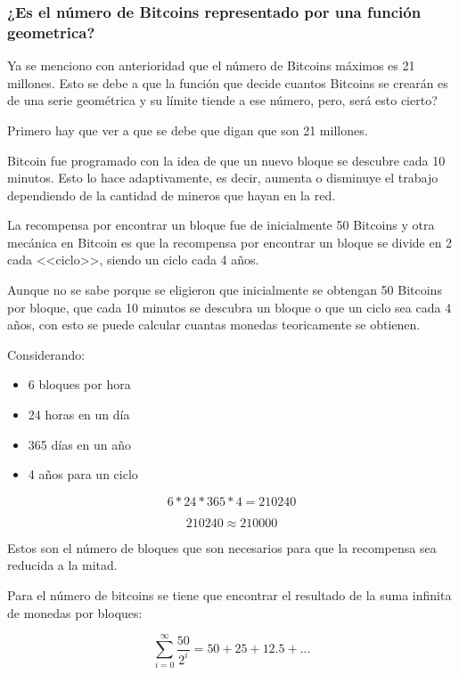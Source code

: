 \documentclass[12pt,letterpaper]{article}
\begin{document}
    \subsubsection*{¿Es el número de Bitcoins representado por una función geometrica?}

    Ya se menciono con anterioridad que el n\'umero de Bitcoins m\'aximos es 21 millones. Esto se debe a que la funci\'on que decide cuantos Bitcoins se crear\'an es de una serie geom\'etrica y su l\'imite tiende a ese n\'umero, pero, ser\'a esto cierto? 

    Primero hay que ver a que se debe que digan que son 21 millones.

    Bitcoin fue programado con la idea de que un nuevo bloque se descubre cada 10 minutos. Esto lo hace adaptivamente, es decir, aumenta o disminuye el trabajo dependiendo de la cantidad de mineros que hayan en la red.

    La recompensa por encontrar un bloque fue de inicialmente 50 Bitcoins y otra mec\'anica en Bitcoin es que la recompensa por encontrar un bloque se divide en 2 cada <<ciclo>>, siendo un ciclo cada 4 a\~nos.

    Aunque no se sabe porque se eligieron que inicialmente se obtengan 50 Bitcoins por bloque, que cada 10 minutos se descubra un bloque o que un ciclo sea cada 4 a\~nos, con esto se puede calcular cuantas monedas teoricamente se obtienen.

    Considerando: 
    \begin{itemize}
        \item 6 bloques por hora 

        \item 24 horas en un d\'ia

        \item 365 d\'ias en un a\~no

        \item4 a\~nos para un ciclo

    \end{itemize}

    $$6 * 24 * 365 * 4 = 210240$$

    $$210240 \approx 210000$$

    Estos son el n\'umero de bloques que son necesarios para que la recompensa sea reducida a la mitad.

    Para el n\'umero de bitcoins se tiene que encontrar el resultado de la suma infinita de monedas por bloques:
    
    $$ \sum_{i = 0}^{\infty} \frac{50}{2^{i}} = 50 + 25 + 12.5 + ...$$
\end{document}
